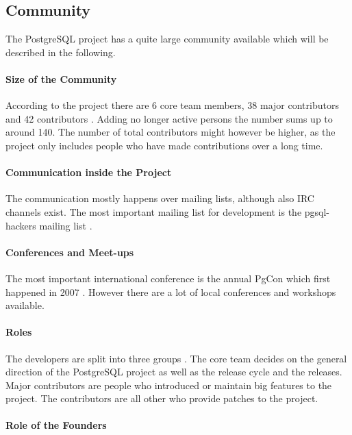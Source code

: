 \subsection{Community}

The PostgreSQL project has a quite large community available which will be
described in the following.

\paragraph{Size of the Community}

According to the project there are 6 core team members, 38 major contributors
and 42 contributors \cite{PostgreSQLContributors}. Adding no longer active
persons the number sums up to around 140. The number of total contributors
might however be higher, as the project only includes people who have made
contributions over a long time.

\paragraph{Communication inside the Project}

The communication mostly happens over mailing lists, although also \ac{IRC}
channels exist. The most important mailing list for development is the
pgsql-hackers mailing list \cite{PostgreSQLDevFAQ}.

\paragraph{Conferences and Meet-ups}

The most important international conference is the annual PgCon which first
happened in 2007 \cite{PostgreSQLEvents}. However there are a lot of local
conferences and workshops available.

\paragraph{Roles}

The developers are split into three groups \cite{PostgreSQLContributors}. The
core team decides on the general direction of the PostgreSQL project as well as
the release cycle and the releases. Major contributors are people who
introduced or maintain big features to the project. The contributors are all
other who provide patches to the project.

\paragraph{Role of the Founders}

